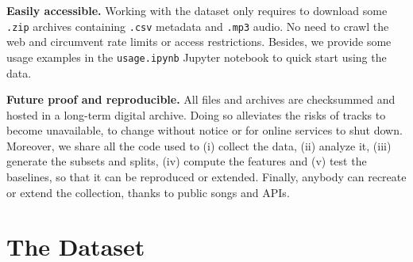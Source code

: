 \documentclass{article}
\newcommand{\todo}[1]{{\color{red} #1}}
\begin{document}
\textbf{Easily accessible.} Working with the dataset only requires to download some \texttt{.zip} archives containing \texttt{.csv} metadata and \texttt{.mp3} audio. No need to crawl the web and circumvent rate limits or access restrictions. Besides, we provide
some usage examples in the \texttt{usage.ipynb} Jupyter notebook to quick start using the data.

\textbf{Future proof and reproducible.} All files and archives are checksummed and hosted in a long-term digital archive.
Doing so alleviates the risks of tracks to become unavailable, to change without notice or for online services to shut down.
Moreover, we share all the code used to (i) collect the data, (ii) analyze it, (iii) generate the subsets and splits, (iv) compute the features and (v) test the baselines, so that it can be reproduced or extended.
Finally, anybody can recreate or extend the collection, thanks to public songs and APIs.




\section{The Dataset} %
\end{document}
